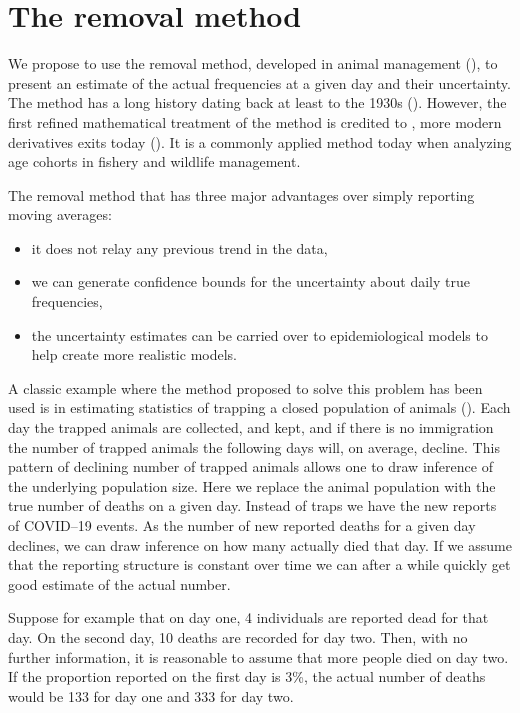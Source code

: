 \documentclass[a4paper,11pt,article,oneside,openany,american]{memoir}
\begin{document}
\chapter{The removal method}
We propose to use the removal method, developed in animal management (\cite{Pollock1991_review_papers}), to present an estimate of the actual frequencies at a given day and their uncertainty. The method has a long history dating back at least to the 1930s (\cite{Leslie1939_attempt_determine}). However, the first refined mathematical treatment of the method is credited to \cite{Moran1951_mathematical_theory}, more modern derivatives exits today (\cite{Matechou2016_open_models}). It is a commonly applied method today when analyzing age cohorts in fishery and wildlife management.

The removal method that has three major advantages over simply reporting moving averages:

\begin{itemize}
	\item it does not relay any previous trend in the data,
	\item we can generate confidence bounds for the uncertainty about daily true frequencies,
	\item the uncertainty estimates can be carried over to epidemiological models to help create more realistic models.
\end{itemize}

A classic example where the method proposed to solve this problem has been used is in estimating statistics of trapping a closed population of animals (\cite{Pollock1991_review_papers}). Each day the trapped animals are collected, and kept, and if there is no immigration the number of trapped animals the following days will, on average, decline. This pattern of declining number of trapped animals allows one to draw inference of the underlying population size. Here we replace the animal population with the true number of deaths
on a given day. Instead of traps we have the new reports of COVID--19 events. As the number of new reported deaths for a given day declines, we can draw inference on how many actually died that day. If we assume that the reporting structure is constant over time we can after a while quickly get good estimate of the actual number.

Suppose for example that on day one, 4 individuals are reported dead for that day. On the second day, 10 deaths are recorded for day two. Then, with no further information, it is reasonable to assume that more people died on day two. If the proportion reported on the first day is 3\%, the actual number of deaths would be 133 for day one and 333 for day two.
\end{document}
